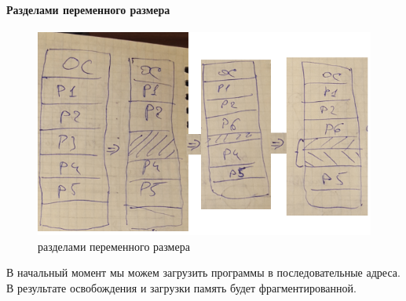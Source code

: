 \paragraph{Разделами переменного размера}

\begin{figure}[H]
	\centering
	\includegraphics[width=\textwidth]{pic/8.png}
	\caption{разделами переменного размера}
\end{figure}

В начальный момент мы можем загрузить программы в последовательные адреса.
В результате освобождения и загрузки память будет фрагментированной.